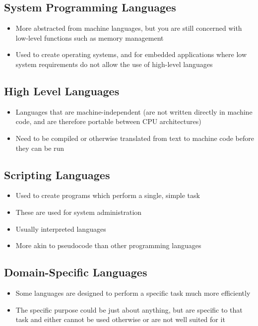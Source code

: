 \subsection*{System Programming Languages}

\begin{itemize}
  \item More abstracted from machine languages, but you are still concerned with low-level functions such as memory
   management
  \item Used to create operating systems, and for embedded applications where low system requirements do not allow
  the use of high-level languages
\end{itemize}

\subsection*{High Level Languages}

\begin{itemize}
  \item Languages that are machine-independent (are not written directly in machine code, and are therefore portable
  between CPU architectures)
  \item Need to be compiled or otherwise translated from text to machine code before they can be run
\end{itemize}

\subsection*{Scripting Languages}

\begin{itemize}
  \item Used to create programs which perform a single, simple task
  \item These are used for system administration
  \item Usually interpreted languages
  \item More akin to pseudocode than other programming languages
\end{itemize}

\subsection*{Domain-Specific Languages}

\begin{itemize}
  \item Some languages are designed to perform a specific task much more efficiently
  \item The specific purpose could be just about anything, but are specific to that task and either cannot be used
   otherwise
  or are not well suited for it
\end{itemize}

